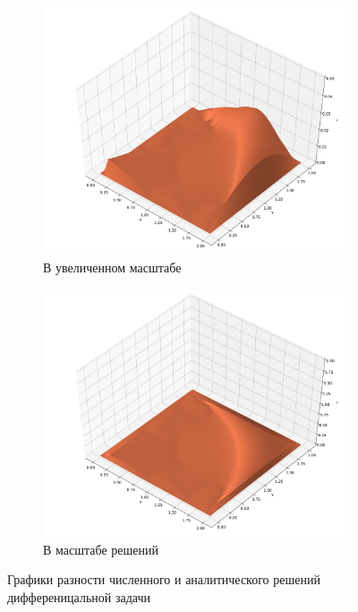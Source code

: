 \documentclass[12pt, a4paper]{article}
\begin{document}
        \begin{figure}[H]
            \centering
            \begin{subfigure}[b]{0.49\textwidth}
                \centering
                \includegraphics[width=\textwidth]{pics/diff.pdf}
                \caption{В увеличенном масштабе}
                \label{fig:plot_diff_a}
            \end{subfigure}
            \begin{subfigure}[b]{0.49\textwidth}
                \centering
                \includegraphics[width=\textwidth]{pics/diff_sc.pdf}
                \caption{{В масштабе решений}}
                \label{fig:plot_diff_b}
            \end{subfigure}
            \caption{Графики разности численного и аналитического решений дифференицальной задачи}
            \label{fig:plot_diff}
        \end{figure}
\end{document}
